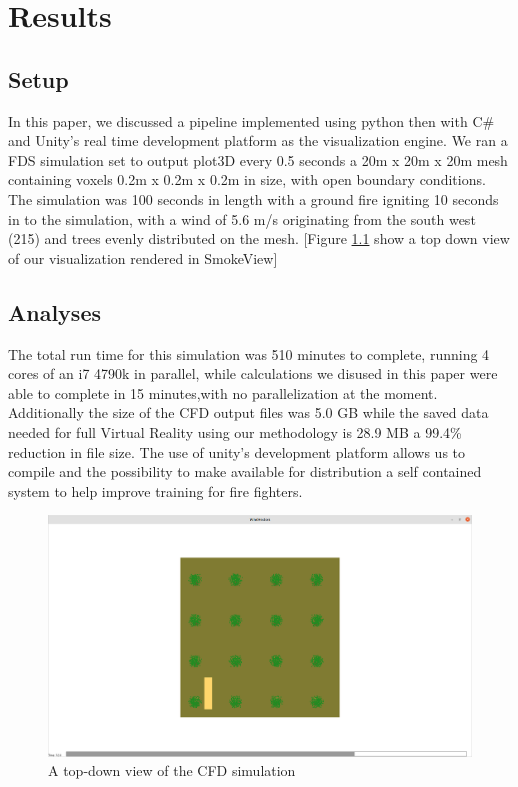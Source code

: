
\chapter{Results} %

\label{Chapter3} %

\section{Setup}
In this paper, we discussed a pipeline implemented using python then with C\# and Unity's real time development platform as the visualization engine. We ran a FDS simulation set to output plot3D every 0.5 seconds a 20m x 20m x 20m mesh containing voxels  0.2m x 0.2m x 0.2m  in size, with open boundary conditions. The simulation was 100 seconds in length with a ground fire igniting 10 seconds in to the simulation, with a wind  of 5.6 m/s originating from the south west (215\textdegree) and trees evenly distributed on the mesh. [Figure \ref{fig:CFDTopDown} show a top down view of our visualization rendered in SmokeView] \par
\section{Analyses}
The total run time for this simulation was  \color{red}510 \color{black} minutes to complete, running 4 cores of an i7 4790k in parallel, while calculations we disused in this paper were able to complete in \color{red} 15 \color{black} minutes,with no parallelization at the moment. Additionally the size of the CFD output files was 5.0 GB while the saved data needed for full Virtual Reality using our methodology is 28.9 MB  a 99.4\% reduction in file size. The use of unity's development platform allows us to compile and the possibility to make available for distribution a self contained system to help improve training for fire fighters.

\begin{figure}
\centering
\includegraphics[scale=.1]{Figures/fdsPartTopView.png}
\decoRule
\caption[CFD Simulation]{A top-down view of the CFD simulation}
\label{fig:CFDTopDown}
\end{figure}